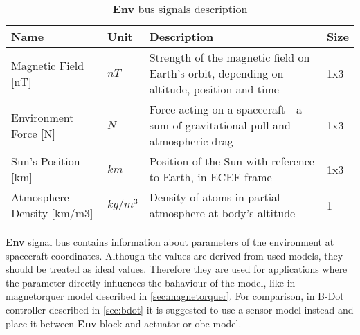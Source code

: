         
        \begin{table}[H]
            \begin{tabularx}{\textwidth}{llXl}
            \textbf{Name} & \textbf{Unit} & \textbf{Description} & \textbf{Size} \\[0.1cm]\hline
            \rule{0pt}{1.2\normalbaselineskip}Magnetic Field [nT] & $nT$ & Strength of the magnetic field on Earth's orbit, depending on altitude, position and time & 1x3 \\
            Environment Force [N]& $N$ & Force acting on a spacecraft - a sum of gravitational pull and atmospheric drag & 1x3 \\
            Sun's Position [km] & $km$ & Position of the Sun with reference to Earth, in ECEF frame & 1x3 \\
            Atmosphere Density [km/m3]& $kg/m^3$ & Density of atoms in partial atmosphere at body's altitude & 1
            \end{tabularx}
            \caption{\textbf{Env} bus signals description}
        \end{table}

        \textbf{Env} signal bus contains information about parameters of the environment at spacecraft coordinates. Although the values are derived from used models, they should be treated as ideal values. Therefore they are used for applications where the parameter directly influences the bahaviour of the model, like in magnetorquer model described in \autoref{sec:magnetorquer}. For comparison, in B-Dot controller described in \autoref{sec:bdot} it is suggested to use a sensor model instead and place it between \textbf{Env} block and actuator or \ac{obc} model.  